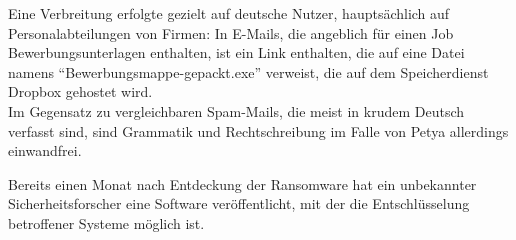 Eine Verbreitung erfolgte gezielt auf deutsche Nutzer, hauptsächlich auf Personalabteilungen von Firmen: In E-Mails, die angeblich für einen Job Bewerbungsunterlagen enthalten, ist ein Link enthalten, die auf eine Datei namens "`Bewerbungsmappe-gepackt.exe"' verweist, die auf dem Speicherdienst Dropbox gehostet wird. \cite{petya:infect} \\
Im Gegensatz zu vergleichbaren Spam-Mails, die meist in krudem Deutsch verfasst sind, sind Grammatik und Rechtschreibung im Falle von Petya allerdings einwandfrei.

Bereits einen Monat nach Entdeckung der Ransomware hat ein unbekannter Sicherheitsforscher eine Software veröffentlicht, mit der die Entschlüsselung betroffener Systeme möglich ist. \cite{petya:end}







